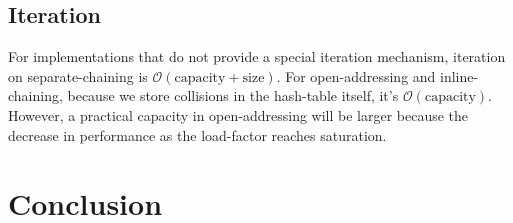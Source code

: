 \documentclass[12pt]{article}
\begin{document}
\subsection{Iteration}

For implementations that do not provide a special iteration mechanism, iteration on separate-chaining is $\mathcal{O}(\text{capacity} + \text{size})$. For open-addressing and inline-chaining, because we store collisions in the hash-table itself, it's $\mathcal{O}(\text{capacity})$. However, a practical capacity in open-addressing will be larger because the decrease in performance as the load-factor reaches saturation.

\section{Conclusion}


\end{document}
